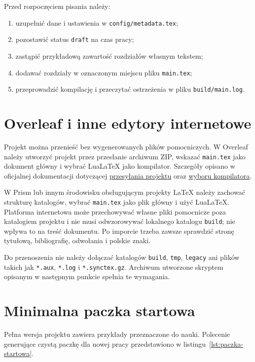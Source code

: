 Przed rozpoczęciem pisania należy:

\begin{enumerate}
  \item uzupełnić dane i ustawienia w \texttt{config/metadata.tex};
  \item pozostawić status \texttt{draft} na czas pracy;
  \item zastąpić przykładową zawartość rozdziałów własnym tekstem;
  \item dodawać rozdziały w oznaczonym miejscu pliku \texttt{main.tex};
  \item przeprowadzić kompilację i przeczytać ostrzeżenia w pliku \texttt{build/main.log}.
\end{enumerate}

\section{Overleaf i inne edytory internetowe}

Projekt można przenieść bez wygenerowanych plików pomocniczych. W Overleaf należy utworzyć projekt przez przesłanie archiwum ZIP, wskazać \texttt{main.tex} jako dokument główny i wybrać LuaLaTeX jako kompilator. Szczegóły opisano w oficjalnej dokumentacji dotyczącej \href{https://docs.overleaf.com/getting-started/creating-a-new-project/uploading-a-project}{przesyłania projektu} oraz \href{https://docs.overleaf.com/getting-started/recompiling-your-project/choosing-a-latex-compiler}{wyboru kompilatora}.

W Prism lub innym środowisku obsługującym projekty LaTeX należy zachować strukturę katalogów, wybrać \texttt{main.tex} jako plik główny i użyć LuaLaTeX. Platforma internetowa może przechowywać własne pliki pomocnicze poza katalogiem projektu i nie musi odwzorowywać lokalnego katalogu \texttt{build}; nie wpływa to na treść dokumentu. Po imporcie trzeba zawsze sprawdzić stronę tytułową, bibliografię, odwołania i polskie znaki.

Do przenoszenia nie należy dołączać katalogów \texttt{build}, \texttt{tmp}, \texttt{legacy} ani plików takich jak \texttt{*.aux}, \texttt{*.log} i \texttt{*.synctex.gz}. Archiwum utworzone skryptem opisanym w następnym punkcie spełnia te wymagania.

\section{Minimalna paczka startowa}

Pełna wersja projektu zawiera przykłady przeznaczone do nauki. Polecenie generujące czystą paczkę dla nowej pracy przedstawiono w listingu~\ref{lst:paczka-startowa}.

